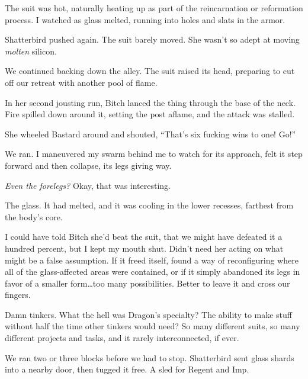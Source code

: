 The suit was hot, naturally heating up as part of the reincarnation or reformation process.  I watched as glass melted, running into holes and slats in the armor.



Shatterbird pushed again.  The suit barely moved.  She wasn't so adept at moving \emph{molten }silicon.



We continued backing down the alley.  The suit raised its head, preparing to cut off our retreat with another pool of flame.



In her second jousting run, Bitch lanced the thing through the base of the neck.  Fire spilled down around it, setting the post aflame, and the attack was stalled.



She wheeled Bastard around and shouted, ``That's six fucking wins to one!  Go!''



We ran.  I maneuvered my swarm behind me to watch for its approach, felt it step forward and then collapse, its legs giving way.



\emph{Even the forelegs?  }Okay, that was interesting.



The glass.  It had melted, and it was cooling in the lower recesses, farthest from the body's core.



I could have told Bitch she'd beat the suit, that we might have defeated it a hundred percent, but I kept my mouth shut.  Didn't need her acting on what might be a false assumption.  If it freed itself, found a way of reconfiguring where all of the glass-affected areas were contained, or if it simply abandoned its legs in favor of a smaller form\ldots too many possibilities.  Better to leave it and cross our fingers.



Damn tinkers.  What the hell was Dragon's specialty?  The ability to make stuff without half the time other tinkers would need?  So many different suits, so many different projects and tasks, and it rarely interconnected, if ever.



We ran two or three blocks before we had to stop.  Shatterbird sent glass shards into a nearby door, then tugged it free.  A sled for Regent and Imp.



